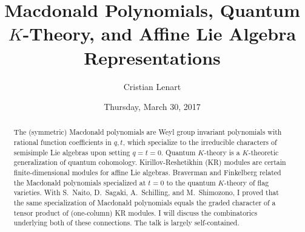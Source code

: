 \documentclass{UAmathtalk}
\author{Cristian Lenart}
\title{Macdonald Polynomials, Quantum \texorpdfstring{\(K\)}{K}-Theory, and Affine Lie Algebra Representations}
\date{Thursday, March 30, 2017}
\begin{document}
\maketitle

\begin{abstract}
The (symmetric) Macdonald polynomials are Weyl group invariant polynomials with rational function coefficients in $q,t$, which specialize to the irreducible characters of semisimple Lie algebras upon setting $q=t=0$. Quantum $K$-theory is a $K$-theoretic generalization of quantum cohomology. Kirillov-Reshetikhin (KR) modules are certain finite-dimensional modules for affine Lie algebras. Braverman and Finkelberg related the Macdonald polynomials specialized at $t=0$ to the quantum $K$-theory of flag varieties.  With S.~Naito, D.~Sagaki, A.~Schilling, and M.~Shimozono, I proved that the same specialization of Macdonald polynomials equals the graded character of a tensor product of (one-column) KR modules. I will discuss the combinatorics underlying both of these connections. The talk is largely self-contained.
\end{abstract}
\end{document}
